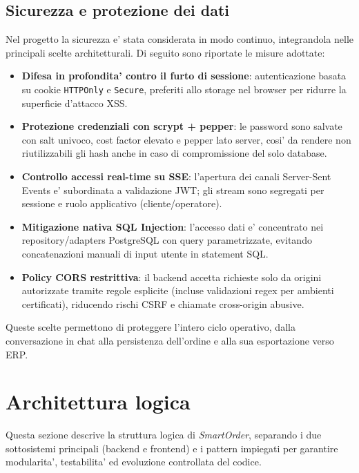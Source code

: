 \documentclass[a4paper, 11pt, oneside]{scrartcl}
\begin{document}
\subsection{Sicurezza e protezione dei dati}
Nel progetto la sicurezza e' stata considerata in modo continuo, integrandola nelle principali scelte architetturali. Di seguito sono riportate le misure adottate:
\begin{itemize}
    \item \textbf{Difesa in profondita' contro il furto di sessione}: autenticazione basata su cookie \texttt{HTTPOnly} e \texttt{Secure}, preferiti allo storage nel browser per ridurre la superficie d'attacco XSS.
    \item \textbf{Protezione credenziali con scrypt + pepper}: le password sono salvate con salt univoco, cost factor elevato e pepper lato server, cosi' da rendere non riutilizzabili gli hash anche in caso di compromissione del solo database.
    \item \textbf{Controllo accessi real-time su SSE}: l'apertura dei canali Server-Sent Events e' subordinata a validazione JWT; gli stream sono segregati per sessione e ruolo applicativo (cliente/operatore).
    \item \textbf{Mitigazione nativa SQL Injection}: l'accesso dati e' concentrato nei repository/adapters PostgreSQL con query parametrizzate, evitando concatenazioni manuali di input utente in statement SQL.
    \item \textbf{Policy CORS restrittiva}: il backend accetta richieste solo da origini autorizzate tramite regole esplicite (incluse validazioni regex per ambienti certificati), riducendo rischi CSRF e chiamate cross-origin abusive.
\end{itemize}

Queste scelte permettono di proteggere l'intero ciclo operativo, dalla conversazione in chat alla persistenza dell'ordine e alla sua esportazione verso ERP.


\newpage
\section{Architettura logica}

Questa sezione descrive la struttura logica di \textit{SmartOrder}, separando i due sottosistemi principali (backend e frontend) e i pattern impiegati per garantire modularita', testabilita' ed evoluzione controllata del codice.
\end{document}

